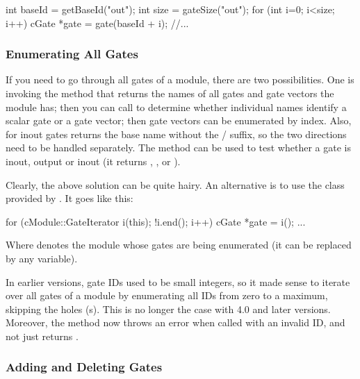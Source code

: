 \begin{cpp}
int baseId = getBaseId("out");
int size = gateSize("out");
for (int i=0; i<size; i++) {
    cGate *gate = gate(baseId + i);
    //...
}
\end{cpp}


\subsubsection{Enumerating All Gates}

If you need to go through all gates of a module, there are
two possibilities. One is invoking the  method
that returns the names of all gates and gate vectors the module
has; then you can call  to determine
whether individual names identify a scalar gate or a gate vector;
then gate vectors can be enumerated by index. Also, for inout
gates  returns the base name without the
/ suffix, so the two directions
need to be handled separately. The  method
can be used to test whether a gate is inout, output or inout
(it returns , , or
).

Clearly, the above solution can be quite hairy. An alternative is to use
the  class provided by .
It goes like this:

\begin{cpp}
for (cModule::GateIterator i(this); !i.end(); i++) {
    cGate *gate = i();
    ...
}
\end{cpp}

Where  denotes the module whose gates are being enumerated
(it can be replaced by any  variable).

\begin{note}
    In earlier {\opp} versions, gate IDs used to be small integers, so
    it made sense to iterate over all gates of a module by enumerating
    all IDs from zero to a maximum, skipping the holes (s).
    This is no longer the case with {\opp} 4.0 and later versions.
    Moreover, the  method now throws an error when called
    with an invalid ID, and not just returns .
\end{note}


\subsubsection{Adding and Deleting Gates}


